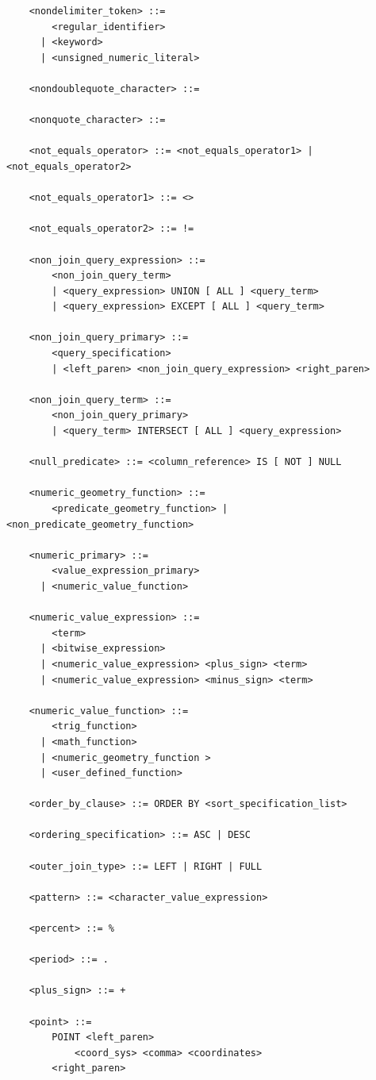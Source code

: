 \documentclass[11pt,a4paper]{ivoa}
\begin{document}
\begin{verbatim}
    <nondelimiter_token> ::=
        <regular_identifier>
      | <keyword>
      | <unsigned_numeric_literal>

    <nondoublequote_character> ::=

    <nonquote_character> ::=

    <not_equals_operator> ::= <not_equals_operator1> | <not_equals_operator2>

    <not_equals_operator1> ::= <>

    <not_equals_operator2> ::= !=

    <non_join_query_expression> ::=
        <non_join_query_term>
        | <query_expression> UNION [ ALL ] <query_term>
        | <query_expression> EXCEPT [ ALL ] <query_term>

    <non_join_query_primary> ::=
        <query_specification>
        | <left_paren> <non_join_query_expression> <right_paren>

    <non_join_query_term> ::=
        <non_join_query_primary>
        | <query_term> INTERSECT [ ALL ] <query_expression>

    <null_predicate> ::= <column_reference> IS [ NOT ] NULL

    <numeric_geometry_function> ::=
        <predicate_geometry_function> | <non_predicate_geometry_function>

    <numeric_primary> ::=
        <value_expression_primary>
      | <numeric_value_function>

    <numeric_value_expression> ::=
        <term>
      | <bitwise_expression>
      | <numeric_value_expression> <plus_sign> <term>
      | <numeric_value_expression> <minus_sign> <term>

    <numeric_value_function> ::=
        <trig_function>
      | <math_function>
      | <numeric_geometry_function >
      | <user_defined_function>

    <order_by_clause> ::= ORDER BY <sort_specification_list>

    <ordering_specification> ::= ASC | DESC

    <outer_join_type> ::= LEFT | RIGHT | FULL

    <pattern> ::= <character_value_expression>

    <percent> ::= %

    <period> ::= .

    <plus_sign> ::= +

    <point> ::=
        POINT <left_paren>
            <coord_sys> <comma> <coordinates>
        <right_paren>


\end{verbatim}
\end{document}
